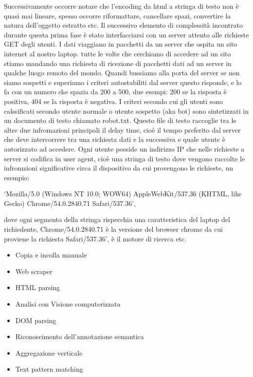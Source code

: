 \documentclass[
  12pt,
  a4paper,
  oneside]{book}
\providecommand{\tightlist}{%
  \setlength{\itemsep}{0pt}\setlength{\parskip}{0pt}}
\begin{document}
Successivamente occorre notare che l'encoding da html a stringa di testo non è quasi mai lineare, spesso occorre riformattare, cancellare spazi, convertire la natura dell'oggetto estratto etc.
Il successivo elemento di complessità incontrato durante questa prima fase è stato interfacciarsi con un server attento alle richieste GET degli utenti. I dati viaggiano in pacchetti da un server che ospita un sito internet al nostro laptop. tutte le volte che cerchiamo di accedere ad un sito stiamo mandando una richiesta di ricezione di pacchetti dati ad un server in qualche luogo remoto del mondo. Quandi bussiamo alla porta del server se non siamo sospetti e superiamo i criteri autostabiliti dal server questo risponde, e lo fa con un numero che spazia da 200 a 500, due esempi: 200 se la risposta è positiva, 404 se la risposta è negativa. I criteri secondo cui gli utenti sono calssificati secondo utente normale o utente sospetto (aka bot) sono sintetizzati in un documento di testo chiamato robot.txt. Questo file di testo raccoglie tra le altre due infromazioni principali il delay time, cioè il tempo preferito dal server che deve intercorrere tra una richiesta dati e la successiva e quale utente è autorizzato ad accedere. Ogni utente posside un indirizzo IP che nelle richieste a server si codifica in user agent, cioè una stringa di testo dove vengono raccolte le infromzioni significative circa il dispositivo da cui provengono le richieste, un esempio:

`Mozilla/5.0 (Windows NT 10.0; WOW64) AppleWebKit/537.36 (KHTML, like Gecko) Chrome/54.0.2840.71 Safari/537.36',

dove ogni segmento della stringa rispecchia una caratteristica del laptop del richiedente, Chrome/54.0.2840.71 è la versione del browser chrome da cui proviene la richiesta Safari/537.36', è il motore di ricerca etc.

\begin{itemize}
\tightlist
\item
  Copia e incolla manuale
\item
  Web scraper
\item
  HTML parsing
\item
  Analisi con Visione computerizzata
\item
  DOM parsing
\item
  Riconoscimento dell'annotazione semantica
\item
  Aggregazione verticale
\item
  Text pattern matching
\end{itemize}
\end{document}
